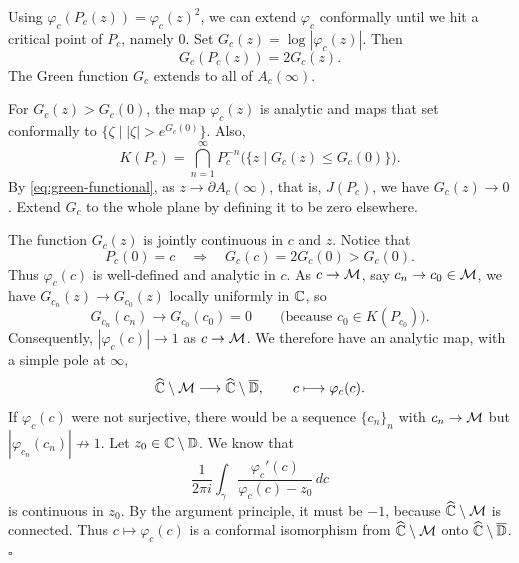 \documentclass[11pt,a4paper]{article}
\begin{document}
Using $\varphi_c(P_c(z))=\varphi_c(z)^2$, we can extend $\varphi_c$ conformally until we hit a critical point of $P_c$, namely $0$. Set $G_c(z)=\log|\varphi_c(z)|$. Then
\begin{equation}\label{eq:green-functional}
G_c(P_c(z))=2G_c(z).
\tag{$\star$}
\end{equation}
The Green function $G_c$ extends to all of $A_c(\infty)$.

For $G_c(z)>G_c(0)$, the map $\varphi_c(z)$ is analytic and maps that set conformally to $\{\zeta\mid |\zeta|>e^{G_c(0)}\}$. Also,
\[
K(P_c)=\bigcap_{n=1}^{\infty}
P_c^{-n}\bigl(\{z\mid G_c(z)\le G_c(0)\}\bigr).
\]
By \eqref{eq:green-functional}, as $z\to\partial A_c(\infty)$, that is, $J(P_c)$, we have $G_c(z)\to0$. Extend $G_c$ to the whole plane by defining it to be zero elsewhere.

The function $G_c(z)$ is jointly continuous in $c$ and $z$. Notice that
\[
P_c(0)=c\quad\Longrightarrow\quad G_c(c)=2G_c(0)>G_c(0).
\]
Thus $\varphi_c(c)$ is well-defined and analytic in $c$. As $c\to\mathcal M$, say $c_n\to c_0\in\mathcal M$, we have $G_{c_n}(z)\to G_{c_0}(z)$ locally uniformly in $\mathbb{C}$, so
\[
G_{c_n}(c_n)\longrightarrow G_{c_0}(c_0)=0
\qquad\bigl(\text{because }c_0\in K(P_{c_0})\bigr).
\]
Consequently, $|\varphi_c(c)|\to1$ as $c\to\mathcal M$. We therefore have an analytic map, with a simple pole at $\infty$,
\[
\widehat{\mathbb C}\setminus\mathcal M\longrightarrow\widehat{\mathbb C}\setminus\overline{\mathbb{D}},
\qquad c\longmapsto\varphi_c(c).
\]
If $\varphi_c(c)$ were not surjective, there would be a sequence $\{c_n\}_n$ with $c_n\to\mathcal M$ but $|\varphi_{c_n}(c_n)|\not\to1$. Let $z_0\in\mathbb{C}\setminus\mathbb{D}$. We know that
\[
\frac{1}{2\pi i}\int_\gamma
\frac{\varphi_c'(c)}{\varphi_c(c)-z_0}\,dc
\]
is continuous in $z_0$. By the argument principle, it must be $-1$, because $\widehat{\mathbb C}\setminus\mathcal M$ is connected. Thus $c\mapsto\varphi_c(c)$ is a conformal isomorphism from $\widehat{\mathbb C}\setminus\mathcal M$ onto $\widehat{\mathbb C}\setminus\overline{\mathbb{D}}$.\hfill$\square$
\end{document}
